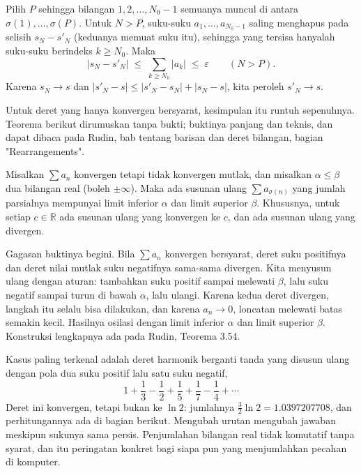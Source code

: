 Pilih $P$ sehingga bilangan $1, 2, \ldots, N_0-1$ semuanya muncul di antara
$\sigma(1), \ldots, \sigma(P)$. Untuk $N > P$, suku-suku $a_1, \ldots, a_{N_0-1}$
saling menghapus pada selisih $s_N - s'_N$ (keduanya memuat suku itu), sehingga yang
tersisa hanyalah suku-suku berindeks $k \ge N_0$. Maka
\[
  \left| s_N - s'_N \right| \;\le\; \sum_{k \ge N_0} |a_k| \;\le\; \varepsilon
  \qquad (N > P).
\]
Karena $s_N \to s$ dan $\left| s'_N - s \right| \le \left| s'_N - s_N \right| +
\left| s_N - s \right|$, kita peroleh $s'_N \to s$.

Untuk deret yang hanya konvergen bersyarat, kesimpulan itu runtuh sepenuhnya. Teorema
berikut dirumuskan tanpa bukti; buktinya panjang dan teknis, dan dapat dibaca pada
Rudin, bab tentang barisan dan deret bilangan, bagian "Rearrangements".

\begin{teorema}
Misalkan $\sum a_n$ konvergen tetapi tidak konvergen mutlak, dan misalkan $\alpha \le
\beta$ dua bilangan real (boleh $\pm\infty$). Maka ada susunan ulang $\sum
a_{\sigma(n)}$ yang jumlah parsialnya mempunyai limit inferior $\alpha$ dan limit
superior $\beta$. Khususnya, untuk setiap $c \in \mathbb{R}$ ada susunan ulang yang
konvergen ke $c$, dan ada susunan ulang yang divergen.
\end{teorema}

Gagasan buktinya begini. Bila $\sum a_n$ konvergen bersyarat, deret suku positifnya
dan deret nilai mutlak suku negatifnya sama-sama divergen. Kita menyusun ulang dengan
aturan: tambahkan suku positif sampai melewati $\beta$, lalu suku negatif sampai turun
di bawah $\alpha$, lalu ulangi. Karena kedua deret divergen, langkah itu selalu bisa
dilakukan, dan karena $a_n \to 0$, loncatan melewati batas semakin kecil. Hasilnya
osilasi dengan limit inferior $\alpha$ dan limit superior $\beta$. Konstruksi
lengkapnya ada pada Rudin, Teorema 3.54.

Kasus paling terkenal adalah deret harmonik berganti tanda yang disusun ulang dengan
pola dua suku positif lalu satu suku negatif,
\[
  1 + \frac{1}{3} - \frac{1}{2} + \frac{1}{5} + \frac{1}{7} - \frac{1}{4} + \cdots
\]
Deret ini konvergen, tetapi bukan ke $\ln 2$: jumlahnya $\tfrac{3}{2}\ln 2 =
1.0397207708$, dan perhitungannya ada di bagian berikut. Mengubah urutan mengubah
jawaban meskipun sukunya sama persis. Penjumlahan bilangan real tidak komutatif tanpa
syarat, dan itu peringatan konkret bagi siapa pun yang menjumlahkan pecahan di
komputer.


